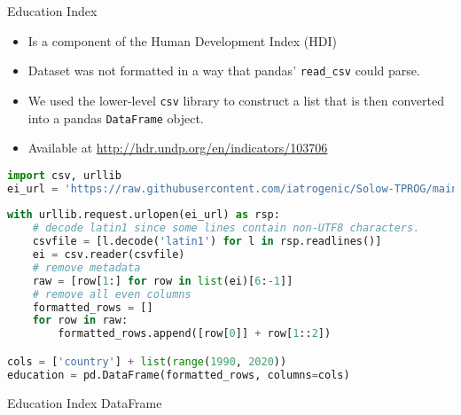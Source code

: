 \documentclass{beamer}
\begin{document}
\begin{frame}{Education Index}
	\begin{itemize}
		\item Is a component of the Human Development Index (HDI)
		\item Dataset was not formatted in a way that pandas' \texttt{read\_csv} could parse.
		\item We used the lower-level \texttt{csv} library to construct a list that is then converted into a pandas \texttt{DataFrame} object.
		\item Available at \url{http://hdr.undp.org/en/indicators/103706}
	\end{itemize}
\end{frame}

\begin{frame}[fragile]
\begin{lstlisting}[language=Python, caption=Processing the Education Index dataset]
import csv, urllib
ei_url = 'https://raw.githubusercontent.com/iatrogenic/Solow-TPROG/main/data/Education_index.csv'	
	
with urllib.request.urlopen(ei_url) as rsp:
	# decode latin1 since some lines contain non-UTF8 characters.
	csvfile = [l.decode('latin1') for l in rsp.readlines()]
	ei = csv.reader(csvfile)
	# remove metadata
	raw = [row[1:] for row in list(ei)[6:-1]]
	# remove all even columns
	formatted_rows = []
	for row in raw:
		formatted_rows.append([row[0]] + row[1::2])

cols = ['country'] + list(range(1990, 2020))
education = pd.DataFrame(formatted_rows, columns=cols)
\end{lstlisting}
\end{frame}

\begin{frame}{Education Index DataFrame}
\end{frame}
\end{document}
